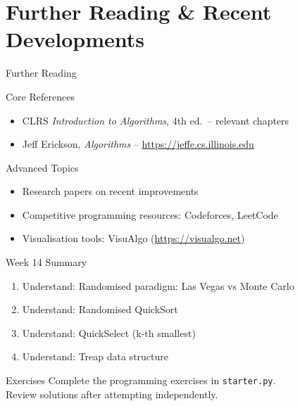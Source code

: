 \documentclass[aspectratio=169,xcolor=dvipsnames]{beamer}
\begin{document}
\section{Further Reading \& Recent Developments}
\begin{frame}{Further Reading}
  \begin{block}{Core References}
    \begin{itemize}
      \item CLRS \textit{Introduction to Algorithms}, 4th ed.\ -- relevant chapters
      \item Jeff Erickson, \textit{Algorithms} -- \url{https://jeffe.cs.illinois.edu}
    \end{itemize}
  \end{block}
  \begin{exampleblock}{Advanced Topics}
    \begin{itemize}
      \item Research papers on recent improvements
      \item Competitive programming resources: Codeforces, LeetCode
      \item Visualisation tools: VisuAlgo (\url{https://visualgo.net})
    \end{itemize}
  \end{exampleblock}
\end{frame}

\begin{frame}{Week 14 Summary}
  \begin{enumerate}
    \item Understand: Randomised paradigm: Las Vegas vs Monte Carlo
    \item Understand: Randomised QuickSort
    \item Understand: QuickSelect (k-th smallest)
    \item Understand: Treap data structure
  \end{enumerate}
  \begin{block}{Exercises}
    Complete the programming exercises in \texttt{starter.py}.\\
    Review solutions after attempting independently.
  \end{block}
\end{frame}
\end{document}
